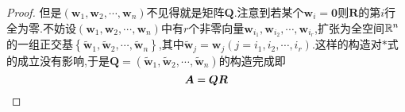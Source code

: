 {\begin{proof}
        但是$\left(
            \bm{w}_1,\bm{w}_2,\cdots,\bm{w}_n
            \right)$不见得就是矩阵$\bm{Q}$.注意到若某个$\bm{w}_i=\bm{0}$则$\bm{R}$的第$i$行全为零.不妨设$\left(
            \bm{w}_1,\bm{w}_2,\cdots,\bm{w}_n
            \right)$中有$r$个非零向量$\bm{w}_{i_1},\bm{w}_{i_2},\cdots,\bm{w}_{i_r}$,扩张为全空间$\mathbb{R} ^n$的一组正交基$\left\{
            \widetilde{\bm{w}}_1,\widetilde{\bm{w}}_2,\cdots,\widetilde{\bm{w}}_n
            \right\}$,其中$\widetilde{\bm{w}}_j=\bm{w}_j\left(j=i_1,i_2,\cdots,i_r\right)$.这样的构造对$\ast$式的成立没有影响,于是$\bm{Q}=\left(
            \widetilde{\bm{w}}_1,\widetilde{\bm{w}}_2,\cdots,\widetilde{\bm{w}}_n
            \right)$的构造完成即\[
            \bm{A}=\bm{QR}\qedhere
        \]
    \end{proof}
}
